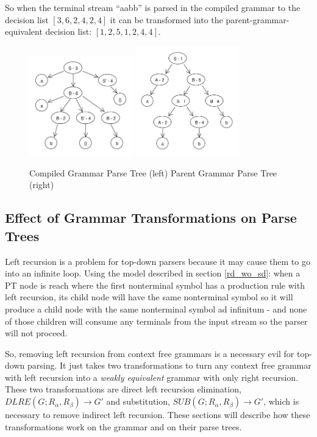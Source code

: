 \documentclass[11pt]{article}
\begin{document}
{So when the terminal stream ``aabb'' is parsed in the compiled
grammar to the decision list $[3, 6, 2, 4, 2, 4]$ it can be transformed
into the parent-grammar-equivalent decision list: $[1, 2, 5, 1, 2, 4, 4]$.

\begin{figure}[h!]
    \centering
    \includegraphics[width=0.4\textwidth,natwidth=458,natheight=444]{umlet/compiled_ex.pdf}
    \includegraphics[width=0.4\textwidth,natwidth=472,natheight=500]{umlet/decompiled_ex.pdf}
    \caption{Compiled Grammar Parse Tree (left) Parent Grammar Parse Tree (right)}
    \label{fig:comp_to_dec_ex}
\end{figure}

\subsection{Effect of Grammar Transformations on Parse Trees}
\label{gram_transforms}
Left recursion is a problem for top-down parsers because it may cause them to
go into an infinite loop. Using the model described in section \ref{rd_wo_sd}:
when a PT node is reach where the first nonterminal symbol has a production rule with
left recursion, its child node will have the same nonterminal symbol so it will produce
a child node with the same nonterminal symbol ad infinitum - and none of those children will
consume any terminals from the input stream so the parser will not proceed. 

So, removing left recursion from context free grammars is a necessary evil for top-down parsing.
It just takes two transformations to turn any context free grammar with left recursion
into a {\em weakly equivalent} grammar with only right recursion.
These two transformations are direct left recursion elimination, 
$DLRE(G; R_\alpha, R_\beta) \rightarrow G'$ and substitution, 
$SUB(G; R_\alpha, R_\beta) \rightarrow G'$, which is necessary to
remove indirect left recursion. \cite{aho, lewis}
These sections will describe how these transformations work on the grammar
and on their parse trees.

}
\end{document}
